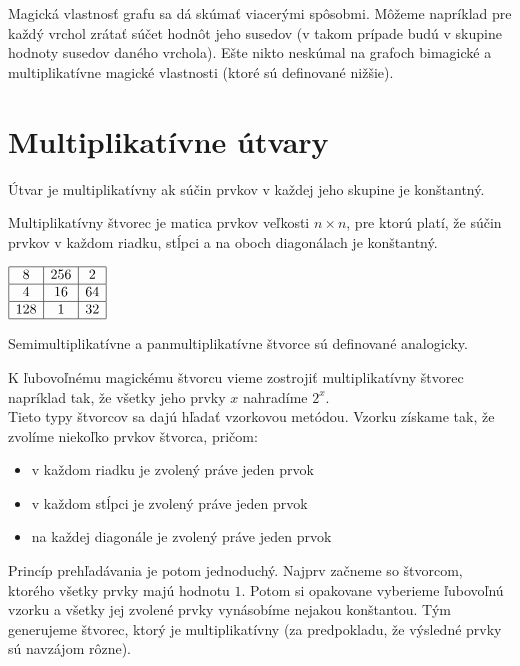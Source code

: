 Magická vlastnosť grafu sa dá skúmať viacerými spôsobmi. Môžeme napríklad pre každý vrchol zrátať súčet hodnôt jeho susedov (v takom prípade budú v skupine hodnoty susedov daného vrchola). Ešte nikto neskúmal na grafoch bimagické a multiplikatívne magické vlastnosti (ktoré sú definované nižšie). \\

\section{Multiplikatívne útvary}
\begin{definition} Útvar je multiplikatívny ak súčin prvkov v každej jeho skupine je konštantný.
\end{definition}

\begin{definition} Multiplikatívny štvorec je matica prvkov veľkosti $n \times n$, pre ktorú platí, že súčin prvkov v každom riadku, stĺpci a na oboch diagonálach je konštantný.
\end{definition}

\begin{center}
$\begin{array}{ |c|c|c| } 
\hline
8 & 256 & 2 \\ 
\hline
4 & 16 & 64 \\ 
\hline
128 & 1 & 32 \\
\hline
\end{array}$
\end{center}

\begin{note} Semimultiplikatívne a panmultiplikatívne štvorce sú definované analogicky.
\end{note}

K ľubovoľnému magickému štvorcu vieme zostrojiť multiplikatívny štvorec napríklad tak, že všetky jeho prvky $x$ nahradíme $2^x$. \\

Tieto typy štvorcov sa dajú hľadať vzorkovou metódou. Vzorku získame tak, že zvolíme niekoľko prvkov štvorca, pričom:
\begin{itemize}
\item v každom riadku je zvolený práve jeden prvok
\item v každom stĺpci je zvolený práve jeden prvok
\item na každej diagonále je zvolený práve jeden prvok
\end{itemize}

Princíp prehľadávania je potom jednoduchý. Najprv začneme so štvorcom, ktorého všetky prvky majú hodnotu $1$. Potom si opakovane vyberieme ľubovoľnú vzorku a všetky jej zvolené prvky vynásobíme nejakou konštantou. Tým generujeme štvorec, ktorý je multiplikatívny (za predpokladu, že výsledné prvky sú navzájom rôzne). \\

